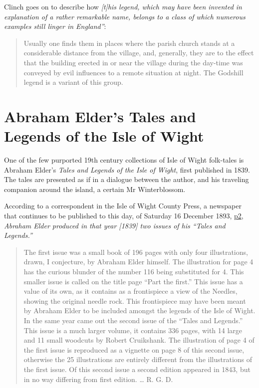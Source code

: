 \documentclass[
  12pt,
  a5paper,
  twoside]{book}
\begin{document}
Clinch goes on to describe how \emph{{[}t{]}his legend, which may have
been invented in explanation of a rather remarkable name, belongs to a
class of which numerous examples still linger in England''}:

\begin{quote}
Usually one finds them in places where the parish church stands at a
considerable distance from the village, and, generally, they are to the
effect that the building erected in or near the village during the
day-time was conveyed by evil influences to a remote situation at night.
The Godshill legend is a variant of this group.
\end{quote}

\let\thefootnote\relax{}


\chapter{Abraham Elder's Tales and Legends of the Isle of
Wight}\label{abraham-elders-tales-and-legends-of-the-isle-of-wight}

One of the few purported 19th century collections of Isle of Wight
folk-tales is Abraham Elder's \emph{Tales and Legends of the Isle of
Wight}, first published in 1839. The tales are presented as if in a
dialogue between the author, and his traveling companion around the
island, a certain Mr Winterblossom.

According to a correspondent in the Isle of Wight County Press, a
newspaper that continues to be published to this day, of Saturday 16
December 1893,
\href{https://www.britishnewspaperarchive.co.uk/viewer/bl/0001960/18931216/025/0002}{p2},
\emph{Abraham Elder produced in that year {[}1839{]} two issues of his
``Tales and Legends.''}

\begin{quote}
The first issue was a small book of 196 pages with only four
illustrations, drawn, I conjecture, by Abraham Elder himself. The
illustration for page 4 has the curious blunder of the number 116 being
substituted for 4. This smaller issue is called on the title page ``Part
the first.'' This issue has a value of its own, as it contains as a
frontispiece a view of the Needles, showing the original needle rock.
This frontispiece may have been meant by Abraham Elder to be included
amongst the legends of the Isle of Wight. In the same year came out the
second issue of the ``Tales and Legends.'' This issue is a much larger
volume, it contains 336 pages, with 14 large and 11 small woodcuts by
Robert Cruikshank. The illustration of page 4 of the first issue is
reproduced as a vignette on page 8 of this second issue, otherwise the
25 illustrations are entirely different from the illustrations of the
first issue. Of this second issue a second edition appeared in 1843, but
in no way differing from first edition. \ldots{} R. G. D.
\end{quote}
\end{document}

